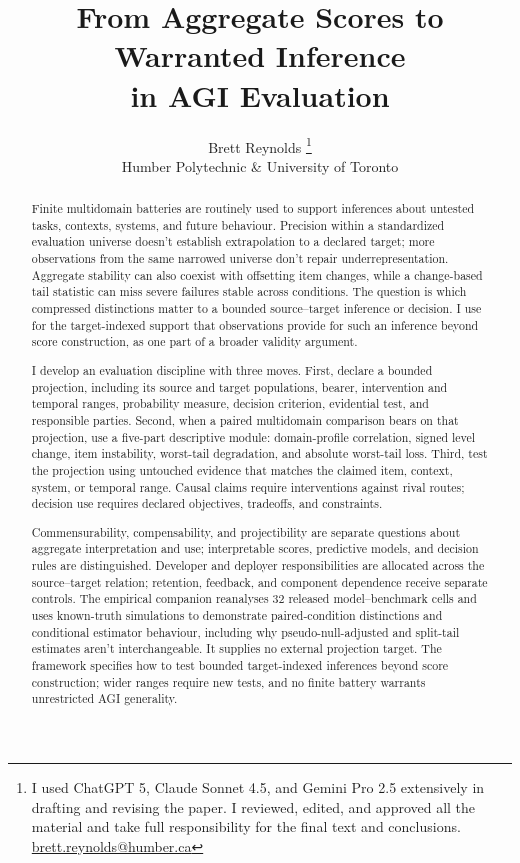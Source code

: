 \documentclass[12pt]{article}
\title{From Aggregate Scores to Warranted Inference\\in AGI Evaluation}
\author{Brett Reynolds \orcidlink{0000-0003-0073-7195}\thanks{I used ChatGPT 5, Claude Sonnet 4.5, and Gemini Pro 2.5 extensively in drafting and revising the paper. I reviewed, edited, and approved all the material and take full responsibility for the final text and conclusions. \href{mailto:brett.reynolds@humber.ca}{brett.reynolds@humber.ca}}\\
Humber Polytechnic \& University of Toronto}
\date{}
\begin{document}
\maketitle

\begin{abstract}
Finite multidomain batteries are routinely used to support inferences about untested tasks, contexts, systems, and future behaviour. Precision within a standardized evaluation universe doesn't establish extrapolation to a declared target; more observations from the same narrowed universe don't repair underrepresentation. Aggregate stability can also coexist with offsetting item changes, while a change-based tail statistic can miss severe failures stable across conditions. The question is which compressed distinctions matter to a bounded source--target inference or decision. I use  for the target-indexed support that observations provide for such an inference beyond score construction, as one part of a broader validity argument.

I develop an evaluation discipline with three moves. First, declare a bounded projection, including its source and target populations, bearer, intervention and temporal ranges, probability measure, decision criterion, evidential test, and responsible parties. Second, when a paired multidomain comparison bears on that projection, use a five-part descriptive module: domain-profile correlation, signed level change, item instability, worst-tail degradation, and absolute worst-tail loss. Third, test the projection using untouched evidence that matches the claimed item, context, system, or temporal range. Causal claims require interventions against rival routes; decision use requires declared objectives, tradeoffs, and constraints.

Commensurability, compensability, and projectibility are separate questions about aggregate interpretation and use; interpretable scores, predictive models, and decision rules are distinguished. Developer and deployer responsibilities are allocated across the source--target relation; retention, feedback, and component dependence receive separate controls. The empirical companion reanalyses 32 released model--benchmark cells and uses known-truth simulations to demonstrate paired-condition distinctions and conditional estimator behaviour, including why pseudo-null-adjusted and split-tail estimates aren't interchangeable. It supplies no external projection target. The framework specifies how to test bounded target-indexed inferences beyond score construction; wider ranges require new tests, and no finite battery warrants unrestricted AGI generality.
\end{abstract}
\end{document}
